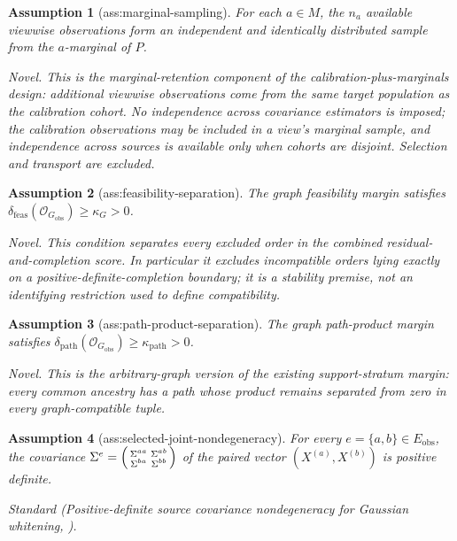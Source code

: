 \documentclass{article}
\newtheorem{assumption}{Assumption}
\begin{document}
\begin{assumption}[ass:marginal-sampling]\label{ass:marginal-sampling}
For each \(a\in M\), the \(n_a\) available viewwise observations form an independent and identically distributed sample from the \(a\)-marginal of \(P\).
\par\smallskip\noindent\emph{Novel.} This is the marginal-retention component of the calibration-plus-marginals design: additional viewwise observations come from the same target population as the calibration cohort. No independence across covariance estimators is imposed; the calibration observations may be included in a view's marginal sample, and independence across sources is available only when cohorts are disjoint. Selection and transport are excluded.
\end{assumption}

\begin{assumption}[ass:feasibility-separation]\label{ass:feasibility-separation}
The graph feasibility margin satisfies \(\delta_{\mathrm{feas}}(\mathcal O_{G_{\mathrm{obs}}})\ge\kappa_G>0\).
\par\smallskip\noindent\emph{Novel.} This condition separates every excluded order in the combined residual-and-completion score. In particular it excludes incompatible orders lying exactly on a positive-definite-completion boundary; it is a stability premise, not an identifying restriction used to define compatibility.
\end{assumption}

\begin{assumption}[ass:path-product-separation]\label{ass:path-product-separation}
The graph path-product margin satisfies \(\delta_{\mathrm{path}}(\mathcal O_{G_{\mathrm{obs}}})\ge\kappa_{\mathrm{path}}>0\).
\par\smallskip\noindent\emph{Novel.} This is the arbitrary-graph version of the existing support-stratum margin: every common ancestry has a path whose product remains separated from zero in every graph-compatible tuple.
\end{assumption}

\begin{assumption}[ass:selected-joint-nondegeneracy]\label{ass:selected-joint-nondegeneracy}
For every \(e=\{a,b\}\in E_{\mathrm{obs}}\), the covariance \(\Sigma^e=\begin{psmallmatrix}\Sigma^{aa}&\Sigma^{ab}\\\Sigma^{ba}&\Sigma^{bb}\end{psmallmatrix}\) of the paired vector \((X^{(a)},X^{(b)})\) is positive definite.
\par\smallskip\noindent\emph{Standard} (Positive-definite source covariance nondegeneracy for Gaussian whitening, \cite{Vershynin2018HighDimensionalProbability}).
\end{assumption}
\end{document}
